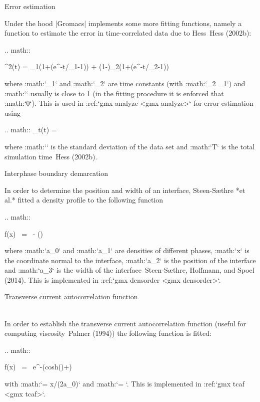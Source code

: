 Error estimation
~~~~~~~~~~~~~~~~

Under the hood |Gromacs| implements some more fitting functions, namely a
function to estimate the error in time-correlated data due to Hess Hess
(2002b):

.. math::

   \varepsilon^2(t) =
   \alpha\tau_1\left(1+\left(e^{-t/\tau_1}-1\right)\right)
         + (1-\alpha)\tau_2\left(1+\left(e^{-t/\tau_2}-1\right)\right)

where :math:`\tau_1` and :math:`\tau_2` are time constants (with
:math:`\tau_2 \ge \tau_1`) and :math:`\alpha` usually is close to 1 (in
the fitting procedure it is enforced that :math:`0\leq\alpha{}`).
This is used in :ref:`gmx analyze <gmx analyze>` for error estimation using

.. math:: \lim_{t\rightarrow\infty}\varepsilon(t) = \sigma{}

where :math:`\sigma` is the standard deviation of the data set and
:math:`T` is the total simulation time Hess (2002b).

Interphase boundary demarcation
~~~~~~~~~~~~~~~~~~~~~~~~~~~~~~~

In order to determine the position and width of an interface,
Steen-Sæthre *et al.* fitted a density profile to the following function

.. math::

   f(x) ~=~  - \left(\right)

where :math:`a_0` and :math:`a_1` are densities of different phases,
:math:`x` is the coordinate normal to the interface, :math:`a_2` is the
position of the interface and :math:`a_3` is the width of the
interface Steen-Sæthre, Hoffmann, and Spoel (2014). This is implemented
in :ref:`gmx densorder <gmx densorder>`.

Transverse current autocorrelation function
~~~~~~~~~~~~~~~~~~~~~~~~~~~~~~~~~~~~~~~~~~~

In order to establish the transverse current autocorrelation function
(useful for computing viscosity Palmer (1994)) the following function is
fitted:

.. math::

   f(x) ~=~ e^{-\nu}\left({\rm cosh}(\omega\nu)+\right)

with :math:`\nu = x/(2a_0)` and :math:`\omega = `. This is
implemented in :ref:`gmx tcaf <gmx tcaf>`.


